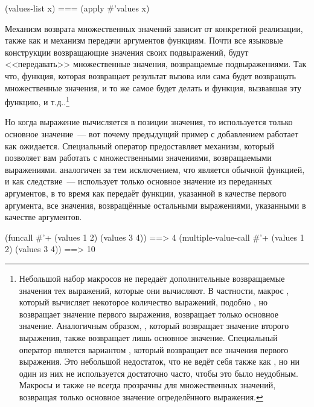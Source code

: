 \begin{myverb}
  (values-list x) === (apply #'values x)
\end{myverb}

Механизм возврата множественных значений зависит от конкретной реализации, также как и
механизм передачи аргументов функциям.  Почти все языковые конструкции возвращающие
значения своих подвыражений, будут <<передавать>> множественные значения, возвращаемые
подвыражениями.  Так что, функция, которая возвращает результат вызова  или
 сама будет возвращать множественные значения, и то же самое будет
делать и функция, вызвавшая эту функцию, и т.д..\footnote{Небольшой набор макросов не
  передаёт дополнительные возвращаемые значения тех выражений, которые они вычисляют.  В
  частности, макрос , который вычисляет некоторое количество выражений,
  подобно , но возвращает значение первого выражения, возвращает только
  основное значение.  Аналогичным образом, , который возвращает значение
  второго выражения, также возвращает лишь основное значение.  Специальный оператор
   является вариантом , который возвращает все
  значения первого выражения.  Это небольшой недостаток, что  не ведёт себя
  также как , но ни один из них не используется достаточно
  часто, чтобы это было неудобным.  Макросы  и  также не всегда
  прозрачны для множественных значений, возвращая только основное значение определённого
  выражения.}

Но когда выражение вычисляется в позиции значения, то используется только основное
значение~--- вот почему предыдущий пример с добавлением работает как ожидается. Специальный
оператор  предоставляет механизм, который позволяет вам работать
с множественными значениями, возвращаемыми выражениями. 
аналогичен  за тем исключением, что  является обычной
функцией, и как следствие~--- использует только основное значение из переданных аргументов,
в то время как  передаёт функции, указанной в качестве первого
аргумента, все значения, возвращённые остальными выражениями, указанными в качестве
аргументов.

\begin{myverb}
  (funcall #'+ (values 1 2) (values 3 4))             ==> 4
  (multiple-value-call #'+ (values 1 2) (values 3 4)) ==> 10
\end{myverb}

